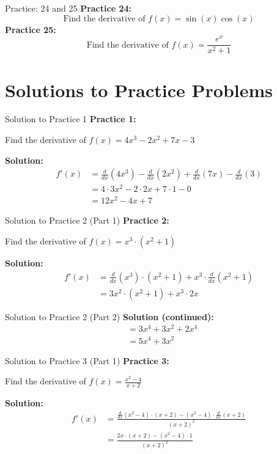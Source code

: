 \documentclass[aspectratio=169]{beamer}
\begin{document}
\begin{frame}{Practice: 24 and 25}
\textbf{Practice 24:}
\[
\text{Find the derivative of } f(x) = \sin(x) \cos(x)
\]
\vspace{1em}
\textbf{Practice 25:}
\[
\text{Find the derivative of } f(x) = \frac{e^x}{x^2 + 1}
\]
\end{frame}

\section{Solutions to Practice Problems}

\begin{frame}{Solution to Practice 1}
\textbf{Practice 1:}

Find the derivative of $f(x) = 4x^3 - 2x^2 + 7x - 3$

\textbf{Solution:}
\[
\begin{aligned}
  f'(x) &= \frac{d}{dx}(4x^3) - \frac{d}{dx}(2x^2) + \frac{d}{dx}(7x) - \frac{d}{dx}(3) \\
  &= 4 \cdot 3x^2 - 2 \cdot 2x + 7 \cdot 1 - 0 \\
  &= 12x^2 - 4x + 7
\end{aligned}
\]
\end{frame}

\begin{frame}{Solution to Practice 2 (Part 1)}
\textbf{Practice 2:}

Find the derivative of $f(x) = x^3 \cdot (x^2 + 1)$

\textbf{Solution:}
\[
\begin{aligned}
  f'(x) &= \frac{d}{dx}(x^3) \cdot (x^2 + 1) + x^3 \cdot \frac{d}{dx}(x^2 + 1) \\
  &= 3x^2 \cdot (x^2 + 1) + x^3 \cdot 2x
\end{aligned}
\]
\end{frame}

\begin{frame}{Solution to Practice 2 (Part 2)}
\textbf{Solution (continued):}
\[
\begin{aligned}
  &= 3x^4 + 3x^2 + 2x^4 \\
  &= 5x^4 + 3x^2
\end{aligned}
\]
\end{frame}

\begin{frame}{Solution to Practice 3 (Part 1)}
\textbf{Practice 3:}

Find the derivative of $f(x) = \frac{x^2 - 4}{x + 2}$

\textbf{Solution:}
\[
\begin{aligned}
  f'(x) &= \frac{\frac{d}{dx}(x^2 - 4) \cdot (x+2) - (x^2 - 4) \cdot \frac{d}{dx}(x+2)}{(x+2)^2} \\
  &= \frac{2x \cdot (x+2) - (x^2 - 4) \cdot 1}{(x+2)^2}
\end{aligned}
\]
\end{frame}
\end{document}
